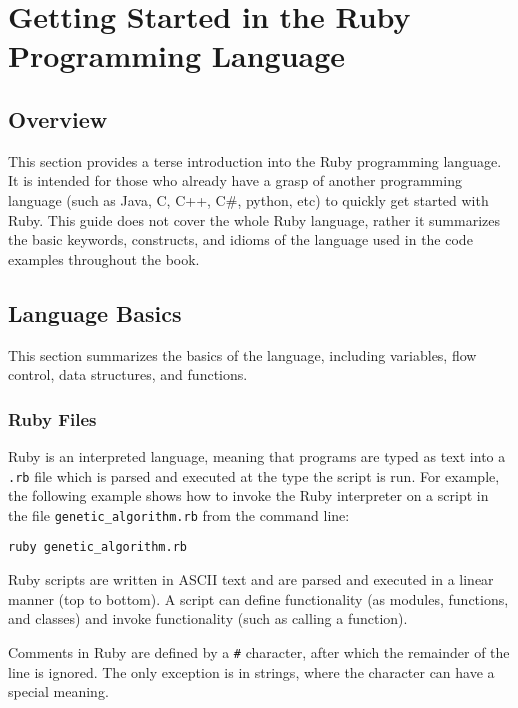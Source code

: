 

\chapter{Getting Started in the Ruby Programming Language}
\label{ch:appendix1}

\section*{Overview}
This section provides a terse introduction into the Ruby programming language. It is intended for those who already have a grasp of another programming language (such as Java, C, C++, C\#, python, etc) to quickly get started with Ruby. This guide does not cover the whole Ruby language, rather it summarizes the basic keywords, constructs, and idioms of the language used in the code examples throughout the book.

\section*{Language Basics}
This section summarizes the basics of the language, including variables, flow control, data structures, and functions.

\subsection{Ruby Files}
Ruby is an interpreted language, meaning that programs are typed as text into a \texttt{.rb} file which is parsed and executed at the type the script is run. For example, the following example shows how to invoke the Ruby interpreter on a script in the file \texttt{genetic_algorithm.rb} from the command line:

\texttt{ruby genetic_algorithm.rb}

Ruby scripts are written in ASCII text and are parsed and executed in a linear manner (top to bottom). A script can define functionality (as modules, functions, and classes) and invoke functionality (such as calling a function). 

Comments in Ruby are defined by a \texttt{#} character, after which the remainder of the line is ignored. The only exception is in strings, where the character can have a special meaning.

